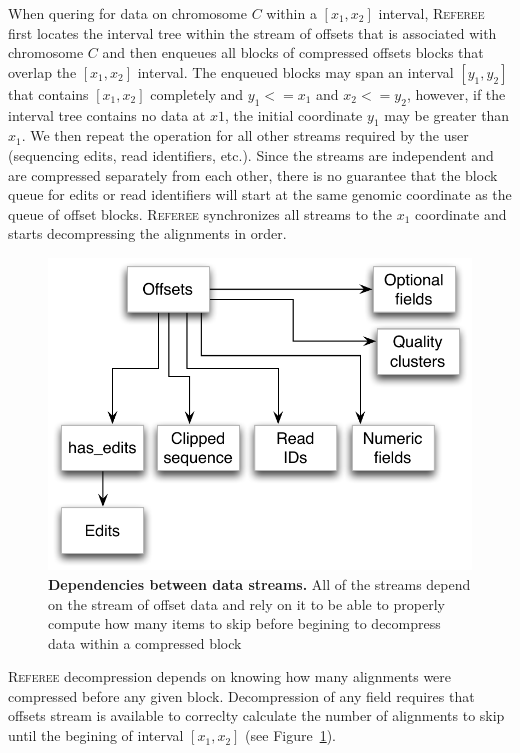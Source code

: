 \documentclass[12pt]{cmuthesis}
\newcommand{\refer}{\textsc{Referee}\xspace}
\begin{document}
  When quering for data on chromosome $C$ within a $[x_1, x_2]$ interval, \refer first locates the interval tree within the stream of offsets that is associated with chromosome $C$ and then enqueues all blocks of compressed offsets blocks that overlap the $[x_1, x_2]$ interval. The enqueued blocks may span an interval $[y_1, y_2]$ that contains $[x_1, x_2]$ completely and  $y_1 <= x_1$ and $x_2 <= y_2$, however, if the interval tree contains no data at $x1$, the initial coordinate $y_1$ may be greater than $x_1$. We then repeat the operation for all other streams required by the user (sequencing edits, read identifiers, etc.). Since the streams are independent and are compressed separately from each other, there is no guarantee that the block queue for edits or read identifiers will start at the same genomic coordinate as the queue of offset blocks. \refer synchronizes all streams to the $x_1$ coordinate and starts decompressing the alignments in order.


  \begin{figure}[ht]
    \centering
    \includegraphics[width=0.6\linewidth]{figures/streams_dependency}
    \caption{\textbf{Dependencies between data streams.} All of the streams depend on the stream of offset data and rely on it to be able to properly compute how many items to skip before begining to decompress data within a compressed block}
    \label{fig:referee:stream_depend}
  \end{figure}


  \refer decompression depends on knowing how many alignments were compressed before any given block. Decompression of any field requires that offsets stream is available to correclty calculate the number of alignments to skip until the begining of interval $[x_1, x_2]$ (see Figure~\ref{fig:referee:stream_depend}).
\end{document}
